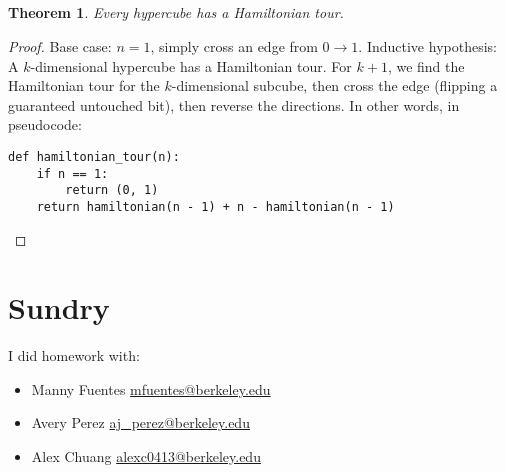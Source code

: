 \documentclass{article}
\newtheorem{theorem}{Theorem}
\begin{document}
\subsection{}

\begin{theorem}
    Every hypercube has a Hamiltonian tour.
\end{theorem}
\begin{proof}
    Base case: \(n = 1\), simply cross an edge from \(0 \to 1\).
    Inductive hypothesis: A \(k\)-dimensional hypercube has a Hamiltonian tour.
    For \(k + 1\), we find the Hamiltonian tour for the \(k\)-dimensional subcube, then cross the edge (flipping a guaranteed untouched bit), then reverse the directions.
    In other words, in pseudocode:
    \begin{lstlisting}
def hamiltonian_tour(n):
    if n == 1:
        return (0, 1)
    return hamiltonian(n - 1) + n - hamiltonian(n - 1)
    \end{lstlisting}
\end{proof}

\section{Sundry}

I did homework with:
\begin{itemize}
    \item Manny Fuentes \href{mailto:mfuentes@berkeley.edu}{mfuentes@berkeley.edu}
    \item Avery Perez \href{mailto:aj_perez@berkeley.edu}{aj\_perez@berkeley.edu}
    \item Alex Chuang \href{mailto:alexc0413@berkeley.edu}{alexc0413@berkeley.edu}
\end{itemize}
\end{document}

